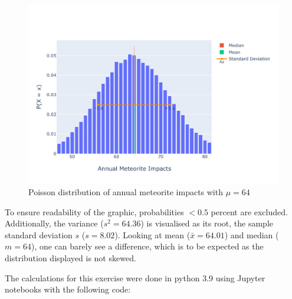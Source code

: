 \begin{figure}[h]
\centering
\includegraphics[width=16cm]{pics/1b.pdf}
\caption{Poisson distribution of annual meteorite impacts with $\mu = 64$}
\label{fig:1b}
\end{figure}
\FloatBarrier

To ensure readability of the graphic, probabilities $<0.5$ percent are excluded. Additionally, the variance ($s^2 = 64.36$) is visualised as its root, the sample standard deviation $s$ ($s = 8.02$). Looking at mean ($\bar{x} = 64.01$) and median ($m = 64$), one can barely see a difference, which is to be expected as the distribution displayed is not skewed. 

The calculations for this exercise were done in python 3.9 using Jupyter notebooks with the following code: 

